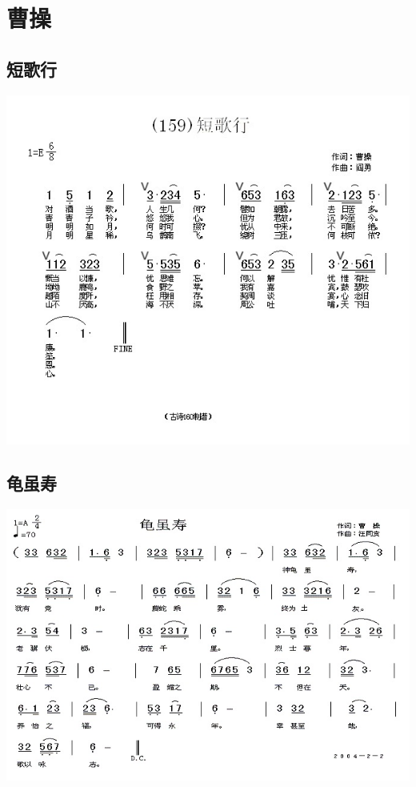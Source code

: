 \documentclass[cn,pad,twocol]{elegantbook}
\begin{document}
\chapter{曹操}
\section{短歌行}
    \includegraphics[width=\textwidth]{dongxiao/20200808-短歌行-曹操.jpg} 
\section{龟虽寿}
    \includegraphics[width=\textwidth]{dongxiao/20200808-神龟虽寿-曹操.jpg}
\end{document}
